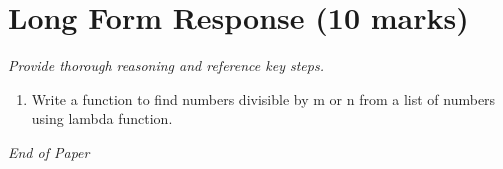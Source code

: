 \documentclass[12pt]{article}
\begin{document}
\begin{enumerate}[label=\arabic*.]
\end{enumerate}

\section*{Long Form Response (10 marks)}
\textit{Provide thorough reasoning and reference key steps.}
\begin{enumerate}[label=\arabic*.]
\item Write a function to find numbers divisible by m or n from a list of numbers using lambda
function.
\end{enumerate}

\vfill
\noindent\textit{End of Paper}
\end{document}
